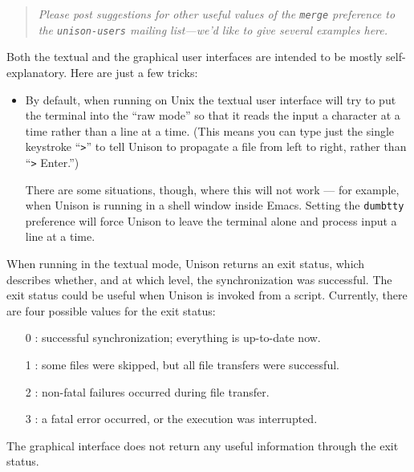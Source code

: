 \documentclass{article}
\begin{document}
\begin{quote}
\it
Please post suggestions for other useful values of the
\verb|merge| preference to the {\tt unison-users} mailing list---we'd like
to give several examples here.
\end{quote}



Both the textual and the graphical user interfaces are intended to be
mostly self-explanatory.  Here are just a few tricks:
\begin{itemize}
\item By default, when running on Unix the textual user interface will
try to put the terminal into the ``raw mode'' so that it reads the input a
character at a time rather than a line at a time.  (This means you can
type just the single keystroke ``\verb|>|'' to tell Unison to
propagate a file from left to right, rather than ``\verb|>| Enter.'')

There are some situations, though, where this will not work --- for
example, when Unison is running in a shell window inside Emacs.
Setting the \verb|dumbtty| preference will force Unison to leave the
terminal alone and process input a line at a time.
\end{itemize}


When running in the textual mode, Unison returns an exit status, which
describes whether, and at which level, the synchronization was successful.
The exit status could be useful when Unison is invoked from a script.
Currently, there are four possible values for the exit status:
\begin{itemize}
\item [0]: successful synchronization; everything is up-to-date now.
\item [1]: some files were skipped, but all file transfers were successful.
\item [2]: non-fatal failures occurred during file transfer.
\item [3]: a fatal error occurred, or the execution was interrupted.
\end{itemize}
The graphical interface does not return any useful information through the
exit status.
\end{document}
